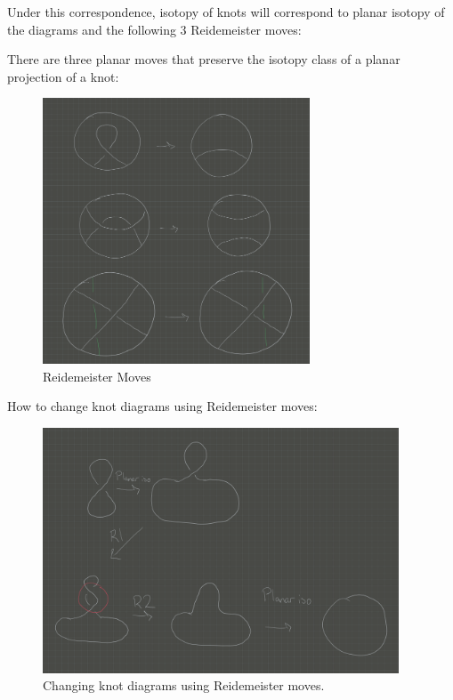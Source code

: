 Under this correspondence, isotopy of knots will correspond to planar
isotopy of the diagrams and the following 3 Reidemeister moves:

\begin{definition}

There are three planar moves that preserve the isotopy class of a planar
projection of a knot:

\begin{figure}
\centering
\includegraphics[width=3.125in,height=\textheight]{figures/image_2020-07-06-11-31-38.png}
\caption{Reidemeister Moves}
\end{figure}

\end{definition}

\begin{example}

How to change knot diagrams using Reidemeister moves:

\begin{figure}
\centering
\includegraphics[width=4.16667in,height=\textheight]{figures/image_2020-07-06-11-35-44.png}
\caption{Changing knot diagrams using Reidemeister moves.}
\end{figure}

\end{example}

